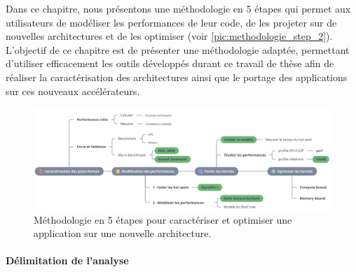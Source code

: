         Dans ce chapitre, nous présentons une méthodologie en 5 étapes qui permet aux utilisateurs de modéliser les performances de leur code, de les projeter sur de nouvelles architectures et de les optimiser (voir \autoref{pic:methodologie_step_2}). L'objectif de ce chapitre est de présenter une méthodologie adaptée, permettant d'utiliser efficacement les outils développés durant ce travail de thèse afin de réaliser la caractérisation des architectures ainsi que le portage des applications sur ces nouveaux accélérateurs.
        
        
        \begin{figure}[h!]
        \center
        \includegraphics[width=17cm]{images/methodologie_step.png}
        \caption{\label{pic:methodologie_step_2} Méthodologie en 5 étapes pour caractériser et optimiser une application sur une nouvelle architecture.}
        \end{figure}
    
    
    \paragraph{Délimitation de l'analyse}

